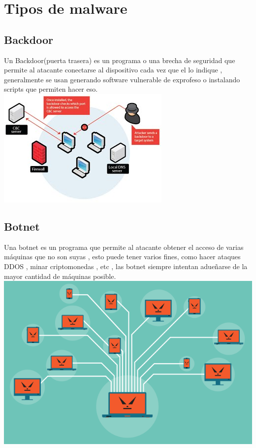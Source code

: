 \documentclass[10pt,a4paper]{article} %
\begin{document}
        \section{Tipos de malware}
            \subsection{Backdoor}
                Un Backdoor(puerta trasera) es un programa o una brecha de
                seguridad que permite al
                atacante conectarse al dispositivo cada vez que el lo indique ,
                generalmente se usan generando software vulnerable de exprofeso
                o instalando scripts que permiten hacer eso. 
                \\ \includegraphics[width=0.8\linewidth]{backdoor.jpg}
                \\ 

            \subsection{Botnet}
                Una botnet es un programa que permite al atacante obtener el
                acceso de varias máquinas que no son suyas , esto puede tener
                varios fines, como hacer ataques DDOS , minar criptomonedas ,
                etc , las botnet siempre intentan adueñarse de la mayor
                cantidad de máquinas posible.
                \\\includegraphics[width=0.8\linewidth]{botnet.jpg}
                \\ 
\end{document}
